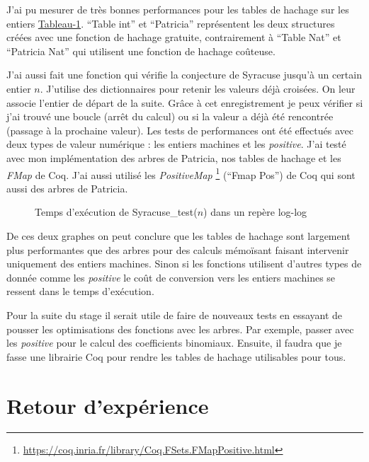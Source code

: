 \documentclass{article}
\begin{document}
J'ai pu mesurer de très bonnes performances pour les tables de hachage
sur les entiers \hyperref[fig:pascal]{Tableau-1}. ``Table int'' et ``Patricia''
représentent les deux structures créées avec une fonction de hachage gratuite,
contrairement à ``Table Nat'' et ``Patricia Nat'' qui utilisent une fonction de
hachage coûteuse.

\newpage

  J'ai aussi fait une fonction qui vérifie la conjecture de Syracuse
jusqu'à un certain entier $n$. J'utilise des dictionnaires pour retenir les
valeurs déjà croisées. On leur associe l'entier de départ de la suite. Grâce à
cet enregistrement je peux vérifier si j'ai trouvé une boucle (arrêt du
calcul) ou si la valeur a déjà été rencontrée (passage à la prochaine valeur).
Les tests de performances ont été effectués avec deux types de valeur numérique :
les entiers machines et les \textit{positive}. J'ai testé avec mon implémentation
des arbres de Patricia, nos tables de hachage et les \textit{FMap} de Coq. J'ai
aussi utilisé les \textit{PositiveMap}
\footnote{\url{https://coq.inria.fr/library/Coq.FSets.FMapPositive.html}}
(``Fmap Pos'') de Coq qui sont aussi des arbres de Patricia.

\begin{figure}[ht]
  \centering
  \scalebox{.7}{}
  \caption{Temps d'exécution de Syracuse\_test($n$) dans un repère log-log}
  \label{fig:syracuse}
\end{figure}

  De ces deux graphes on peut conclure que les tables de hachage sont largement
plus performantes que des arbres pour des calculs mémoïsant faisant intervenir
uniquement des entiers machines. Sinon si les fonctions utilisent d'autres types
de donnée comme les \textit{positive} le coût de conversion vers les entiers
machines se ressent dans le temps d'exécution.

  Pour la suite du stage il serait utile de faire de nouveaux tests en essayant
de pousser les optimisations des fonctions avec les arbres. Par exemple, passer
avec les \textit{positive} pour le calcul des coefficients binomiaux. Ensuite,
il faudra que je fasse une librairie Coq pour rendre les tables de hachage
utilisables pour tous.

  \newpage
  \section{Retour d'expérience}
\end{document}

